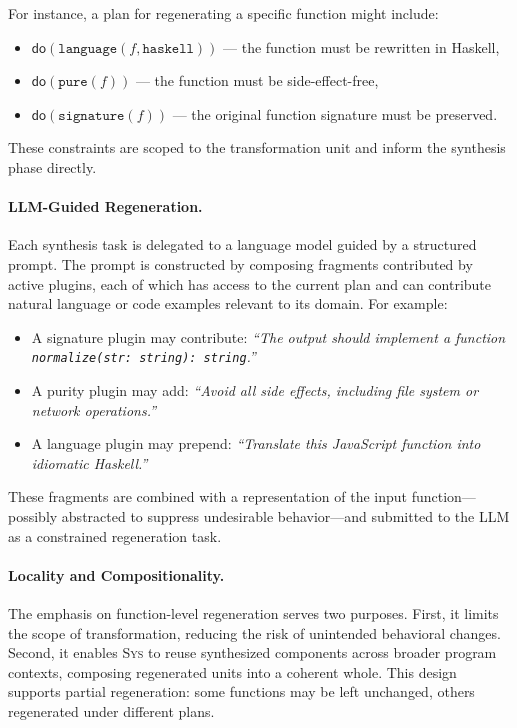 \documentclass[sigplan]{acmart}
\newcommand{\sys}{{\scshape Sys}\xspace}
\begin{document}
For instance, a plan for regenerating a specific function might include:
\begin{itemize}
  \item $\mathsf{do}(\texttt{language}(f, \texttt{haskell}))$ — the function must be rewritten in Haskell,
  \item $\mathsf{do}(\texttt{pure}(f))$ — the function must be side-effect-free,
  \item $\mathsf{do}(\texttt{signature}(f))$ — the original function signature must be preserved.
\end{itemize}
These constraints are scoped to the transformation unit and inform the synthesis phase directly.

\paragraph{LLM-Guided Regeneration.}
Each synthesis task is delegated to a language model guided by a structured prompt. The prompt is constructed by composing fragments contributed by active plugins, each of which has access to the current plan and can contribute natural language or code examples relevant to its domain. For example:
\begin{itemize}
  \item A signature plugin may contribute: \emph{“The output should implement a function \texttt{normalize(str: string): string}.”}
  \item A purity plugin may add: \emph{“Avoid all side effects, including file system or network operations.”}
  \item A language plugin may prepend: \emph{“Translate this JavaScript function into idiomatic Haskell.”}
\end{itemize}

These fragments are combined with a representation of the input function—possibly abstracted to suppress undesirable behavior—and submitted to the LLM as a constrained regeneration task.

\paragraph{Locality and Compositionality.}
The emphasis on function-level regeneration serves two purposes. First, it limits the scope of transformation, reducing the risk of unintended behavioral changes. Second, it enables \sys to reuse synthesized components across broader program contexts, composing regenerated units into a coherent whole. This design supports partial regeneration: some functions may be left unchanged, others regenerated under different plans.
\end{document}
